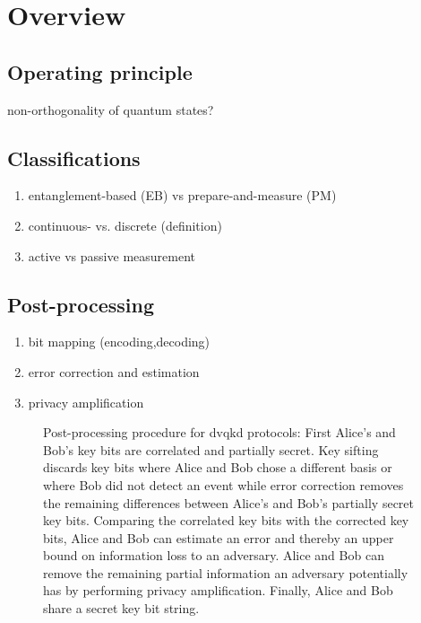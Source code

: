 \section{Overview}

\subsection{Operating principle}

non-orthogonality of quantum states?

\subsection{Classifications}


\begin{enumerate}
	\item entanglement-based (EB) vs prepare-and-measure (PM)
	\item continuous- vs. discrete (definition)
	\item active vs passive measurement
\end{enumerate}

\subsection{Post-processing}

\begin{enumerate}
	\item bit mapping (encoding,decoding)
	\item error correction and estimation
	\item privacy amplification
\end{enumerate}

\begin{figure}[htb]
	\centering
	
	\caption{Post-processing procedure for \gls{dvqkd} protocols: First Alice's and Bob's key bits are correlated and partially secret. Key sifting discards key bits where Alice and Bob chose a different basis or where Bob did not detect an event while error correction removes the remaining differences between Alice's and Bob's partially secret key bits. Comparing the correlated key bits with the corrected key bits, Alice and Bob can estimate an error and thereby an upper bound on information loss to an adversary. Alice and Bob can remove the remaining partial information an adversary potentially has by performing privacy amplification. Finally, Alice and Bob share a secret key bit string.}\label{fig:post_processing}
\end{figure}

